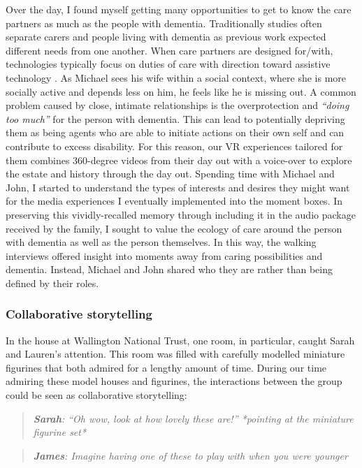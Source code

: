 Over the day, I found myself getting many opportunities to get to know the care partners as much as the people with dementia. Traditionally studies often separate carers and people living with dementia as previous work expected different needs from one another. When care partners are designed for/with, technologies typically focus on duties of care with direction toward assistive technology \citep{bennett_assistive_2017, gibson2015everyday}. As Michael sees his wife within a social context, where she is more socially active and depends less on him, he feels like he is missing out. A common problem caused by close, intimate relationships is the overprotection and \textit{``doing too much''} for the person with dementia. This can lead to potentially depriving them as being agents who are able to initiate actions on their own self and can contribute to excess disability. For this reason, our VR experiences tailored for them combines 360-degree videos from their day out with a voice-over to explore the estate and history through the day out. Spending time with Michael and John, I started to understand the types of interests and desires they might want for the media experiences I eventually implemented into the moment boxes. In preserving this vividly-recalled memory through including it in the audio package received by the family, I sought to value the ecology of care around the person with dementia as well as the person themselves. In this way, the walking interviews offered insight into moments away from caring possibilities and dementia. Instead, Michael and John shared who they are rather than being defined by their roles. 

\subsubsection{Collaborative storytelling}
\label{CollabStorytelling}
In the house at Wallington National Trust, one room, in particular, caught Sarah and Lauren's attention. This room was filled with carefully modelled miniature figurines that both admired for a lengthy amount of time. During our time admiring these model houses and figurines, the interactions between the group could be seen as collaborative storytelling:
\begin{quote}
   \textit{\textbf{ Sarah}: ``Oh wow, look at how lovely these are!''
   *pointing at the miniature figurine set*}
\end{quote}

\begin{quote}
    \textit{\textbf{James}:  Imagine having one of these to play with when you were younger}
\end{quote}


